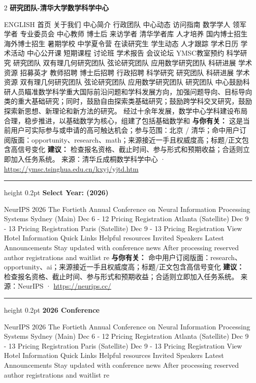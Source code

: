 \documentclass[10.5pt]{ctexart}
\begin{document}
\begin{multicols}{2}
{\large\bfseries 研究团队-清华大学数学科学中心}\par
ENGLISH 首页 关于我们 中心简介 行政团队 中心动态 访问指南 数学学人 领军学者 专业委员会 中心教师 博士后 来访学者 清华学者库 人才培养 国内博士招生 海外博士招生 暑期学校 中学夏令营 在读研究生 学生动态 人才跟踪 学术日历 学术活动 中心公开课 短期课程 讨论班 学术报告 会议论坛 YMSC教室预约 科学研究 研究团队 双有理几何研究团队 弦论研究团队 应用数学研究团队 科研进展 学术资源 招募英才 教师招聘 博士后招聘 行政招聘 科学研究 研究团队 科研进展 学术资源 双有理几何研究团队 弦论研究团队 应用数学研究团队 研究团队 中心鼓励科研人员瞄准数学科学重大国际前沿问题和学科发展方向，加强问题导向、目标导向类的重大基础研究；同时，鼓励自由探索类基础研究；鼓励跨学科交叉研究，鼓励探索新思想、新理论和新方法的研究。 经过十余年发展，数学中心学科建设布局合理，稳步推进，以基础数学为核心，组建了包括基础数学和
\textbf{与你有关：} 这是当前用户可实际参与或申请的高可触达机会；参与范围：北京 / 清华；命中用户订阅版面：opportunity、research、math；来源接近一手且权威度高；标题/正文包含高信号变化
\textbf{建议：} 检查报名资格、截止时间、参与形式和预期收益；合适则立即加入任务系统。
{\footnotesize\color{ormuted} 来源：清华丘成桐数学科学中心 · \url{https://ymsc.tsinghua.edu.cn/kxyj/yjtd.htm}}
\vspace{2mm}
\hrule height 0.2pt
\vspace{2mm}
{\large\bfseries Select Year: (2026)}\par
NeurIPS 2026 The Fortieth Annual Conference on Neural Information Processing Systems Sydney (Main) Dec 6 - 12 Pricing Registration Atlanta (Satellite) Dec 9 - 13 Pricing Registration Paris (Satellite) Dec 9 - 13 Pricing Registration View Hotel Information Quick Links Helpful resources Invited Speakers Latest Announcements Stay updated with conference news After processing reserved author registrations and waitlist re
\textbf{与你有关：} 命中用户订阅版面：research、opportunity、ai；来源接近一手且权威度高；标题/正文包含高信号变化
\textbf{建议：} 检查报名资格、截止时间、参与形式和预期收益；合适则立即加入任务系统。
{\footnotesize\color{ormuted} 来源：NeurIPS · \url{https://neurips.cc/}}
\vspace{2mm}
\hrule height 0.2pt
\vspace{2mm}
{\large\bfseries 2026 Conference}\par
NeurIPS 2026 The Fortieth Annual Conference on Neural Information Processing Systems Sydney (Main) Dec 6 - 12 Pricing Registration Atlanta (Satellite) Dec 9 - 13 Pricing Registration Paris (Satellite) Dec 9 - 13 Pricing Registration View Hotel Information Quick Links Helpful resources Invited Speakers Latest Announcements Stay updated with conference news After processing reserved author registrations and waitlist re

\end{multicols}
\end{document}
